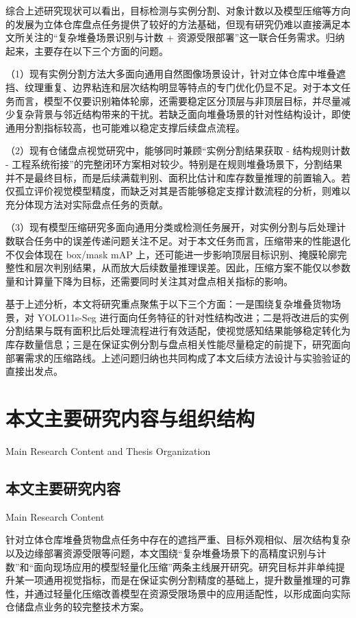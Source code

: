 综合上述研究现状可以看出，目标检测与实例分割、对象计数以及模型压缩等方向的发展为立体仓库盘点任务提供了较好的方法基础，但现有研究仍难以直接满足本文所关注的“复杂堆叠场景识别与计数 + 资源受限部署”这一联合任务需求。归纳起来，主要存在以下三个方面的问题。

\par\noindent
（1）现有实例分割方法大多面向通用自然图像场景设计，针对立体仓库中堆叠遮挡、纹理重复、边界粘连和层次结构明显等特点的专门优化仍显不足。对于本文任务而言，模型不仅要识别箱体轮廓，还需要稳定区分顶层与非顶层目标，并尽量减少复杂背景与邻近结构带来的干扰。若缺乏面向堆叠场景的针对性结构设计，即使通用分割指标较高，也可能难以稳定支撑后续盘点流程。

\par\noindent
（2）现有仓储盘点视觉研究中，能够同时兼顾“实例分割结果获取 - 结构规则计数 - 工程系统衔接”的完整闭环方案相对较少。特别是在规则堆叠场景下，分割结果并不是最终目标，而是后续满载判别、面积比估计和库存数量推理的前置输入。若仅孤立评价视觉模型精度，而缺乏对其是否能够稳定支撑计数流程的分析，则难以充分体现方法对实际盘点任务的贡献。

\par\noindent
（3）现有模型压缩研究多面向通用分类或检测任务展开，对实例分割与后处理计数联合任务中的误差传递问题关注不足。对于本文任务而言，压缩带来的性能退化不仅会体现在 box/mask mAP 上，还可能进一步影响顶层目标识别、掩膜轮廓完整性和层次判别结果，从而放大后续数量推理误差。因此，压缩方案不能仅以参数量和计算量下降为目标，还需要同时关注其对盘点相关指标的影响。

基于上述分析，本文将研究重点聚焦于以下三个方面：一是围绕复杂堆叠货物场景，对 YOLO11s-Seg 进行面向任务特征的针对性结构改进；二是将改进后的实例分割结果与既有面积比后处理流程进行有效适配，使视觉感知结果能够稳定转化为库存数量信息；三是在保证实例分割与盘点相关性能尽量稳定的前提下，研究面向部署需求的压缩路线。上述问题归纳也共同构成了本文后续方法设计与实验验证的直接出发点。

\section{本文主要研究内容与组织结构}{Main Research Content and Thesis Organization}

\subsection{本文主要研究内容}{Main Research Content}

针对立体仓库堆叠货物盘点任务中存在的遮挡严重、目标外观相似、层次结构复杂以及边缘部署资源受限等问题，本文围绕“复杂堆叠场景下的高精度识别与计数”和“面向现场应用的模型轻量化压缩”两条主线展开研究。研究目标并非单纯提升某一项通用视觉指标，而是在保证实例分割精度的基础上，提升数量推理的可靠性，并通过轻量化压缩改善模型在资源受限场景中的应用适配性，以形成面向实际仓储盘点业务的较完整技术方案。


